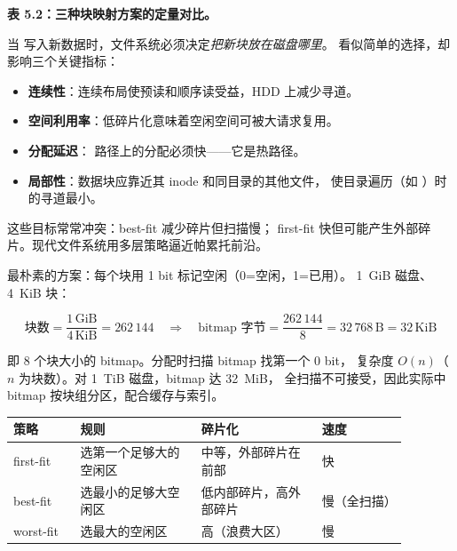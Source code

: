 \begin{filesystemlayout}
{\par\noindent\textbf{表 5.2：三种块映射方案的定量对比。}\par}



当  写入新数据时，文件系统必须决定\emph{把新块放在磁盘哪里}。
看似简单的选择，却影响三个关键指标：

\begin{itemize}\tightlist
\item \textbf{连续性}：连续布局使预读和顺序读受益，HDD 上减少寻道。
\item \textbf{空间利用率}：低碎片化意味着空闲空间可被大请求复用。
\item \textbf{分配延迟}： 路径上的分配必须快——它是热路径。
\item \textbf{局部性}：数据块应靠近其 inode 和同目录的其他文件，
  使目录遍历（如 ）时的寻道最小。
\end{itemize}

这些目标常常冲突：best-fit 减少碎片但扫描慢；
first-fit 快但可能产生外部碎片。现代文件系统用多层策略逼近帕累托前沿。


最朴素的方案：每个块用 1 bit 标记空闲（0=空闲，1=已用）。
1~GiB 磁盘、4~KiB 块：

\[
\text{块数} = \frac{1\,\text{GiB}}{4\,\text{KiB}} = 262\,144
\quad\Rightarrow\quad
\text{bitmap 字节} = \frac{262\,144}{8} = 32\,768\,\text{B} = 32\,\text{KiB}
\]

即 8 个块大小的 bitmap。分配时扫描 bitmap 找第一个 0 bit，
复杂度 $O(n)$（$n$ 为块数）。对 1~TiB 磁盘，bitmap 达 32~MiB，
全扫描不可接受，因此实际中 bitmap 按块组分区，配合缓存与索引。


\begin{longtable}{|F{0.15\linewidth}|F{0.27\linewidth}|F{0.27\linewidth}|F{0.19\linewidth}|}
\toprule
{}
\textbf{策略} & \textbf{规则} & \textbf{碎片化} & \textbf{速度} \\
\midrule
first-fit  & 选第一个足够大的空闲区 & 中等，外部碎片在前部 & 快 \\\tablerowrule
best-fit   & 选最小的足够大空闲区   & 低内部碎片，高外部碎片 & 慢（全扫描） \\\tablerowrule
worst-fit  & 选最大的空闲区         & 高（浪费大区）        & 慢 \\
\bottomrule
\end{longtable}


\end{filesystemlayout}
